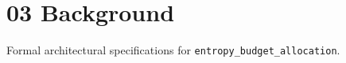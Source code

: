 \section{03 Background}

Formal architectural specifications for \texttt{entropy_budget_allocation}.
